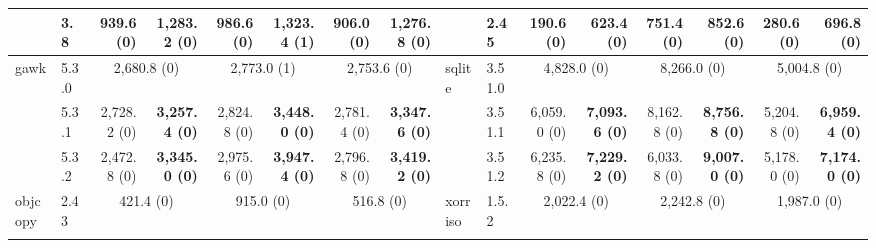 \begin{table}[]
{\begin{tabular}{l|l|rr|rr|rr||l|l|rr|rr|rr}
                         & 3.8                      & \multicolumn{1}{r|}{939.6 (0)}   & \textbf{1,283.2 (0)}      & \multicolumn{1}{r|}{986.6 (0)}   & \textbf{1,323.4 (1)}      & \multicolumn{1}{r|}{906.0 (0)}   & \textbf{1,276.8 (0)}      &                          & 2.45                     & \multicolumn{1}{r|}{190.6 (0)}   & \textbf{623.4 (0)}        & \multicolumn{1}{r|}{751.4 (0)}   & \textbf{852.6 (0)}        & \multicolumn{1}{r|}{280.6 (0)}   & \textbf{696.8 (0)}       \\ \midrule
    \multirow{3}{*}{gawk}    & 5.3.0                    & \multicolumn{2}{c|}{2,680.8 (0)}                             & \multicolumn{2}{c|}{2,773.0 (1)}                             & \multicolumn{2}{c||}{2,753.6 (0)}                             & \multirow{3}{*}{sqlite}  & 3.51.0                   & \multicolumn{2}{c|}{4,828.0 (0)}                             & \multicolumn{2}{c|}{8,266.0 (0)}                             & \multicolumn{2}{c}{5,004.8 (0)}                             \\ \cmidrule(lr){2-8} \cmidrule{10-16} 
                             & 5.3.1                    & \multicolumn{1}{r|}{2,728.2 (0)} & \textbf{3,257.4 (0)}      & \multicolumn{1}{r|}{2,824.8 (0)} & \textbf{3,448.0 (0)}      & \multicolumn{1}{r|}{2,781.4 (0)} & \textbf{3,347.6 (0)}      &                          & 3.51.1                   & \multicolumn{1}{r|}{6,059.0 (0)} & \textbf{7,093.6 (0)}      & \multicolumn{1}{r|}{8,162.8 (0)} & \textbf{8,756.8 (0)}      & \multicolumn{1}{r|}{5,204.8 (0)} & \textbf{6,959.4 (0)}     \\ \cmidrule(lr){2-8} \cmidrule{10-16} 
                             & 5.3.2                    & \multicolumn{1}{r|}{2,472.8 (0)} & \textbf{3,345.0 (0)}      & \multicolumn{1}{r|}{2,975.6 (0)} & \textbf{3,947.4 (0)}      & \multicolumn{1}{r|}{2,796.8 (0)} & \textbf{3,419.2 (0)}      &                          & 3.51.2                   & \multicolumn{1}{r|}{6,235.8 (0)} & \textbf{7,229.2 (0)}      & \multicolumn{1}{r|}{6,033.8 (0)} & \textbf{9,007.0 (0)}      & \multicolumn{1}{r|}{5,178.0 (0)} & \textbf{7,174.0 (0)}     \\ \midrule
    \multirow{3}{*}{objcopy} & 2.43                     & \multicolumn{2}{c|}{421.4 (0)}                               & \multicolumn{2}{c|}{915.0 (0)}                               & \multicolumn{2}{c||}{516.8 (0)}                               & \multirow{3}{*}{xorriso} & 1.5.2                    & \multicolumn{2}{c|}{2,022.4 (0)}                             & \multicolumn{2}{c|}{2,242.8 (0)}                             & \multicolumn{2}{c}{1,987.0 (0)}                             \\ \cmidrule(lr){2-8} \cmidrule{10-16} 

\end{tabular}}
\end{table}
